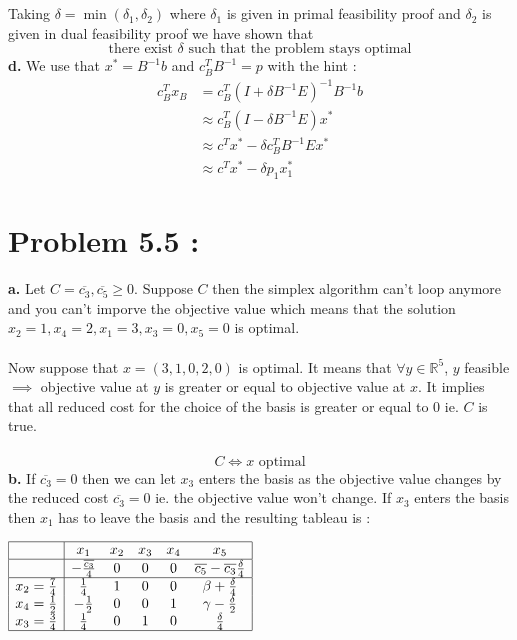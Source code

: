 \documentclass{article}
\begin{document}
\\\\
Taking $\delta = \min(\delta_1,\delta_2)$ where $\delta_1$ is given in primal feasibility proof and $\delta_2$ is given in dual feasibility proof we have shown that $$\boxed{\text{there exist $\delta$ such that the problem stays optimal}}$$
\textbf{d.} We use that $x^* = B^{-1}b$ and $c_B^TB^{-1} = p$ with the hint : $$\boxed{\begin{split}
    c_B^Tx_B &= c_B^T(I+\delta B^{-1} E)^{-1}B^{-1}b\\
    &\approx c_B^T(I-\delta B^{-1} E)x^*\\
    &\approx c^Tx^*-\delta c_B^TB^{-1} Ex^*\\
    &\approx c^Tx^*-\delta p_1x^*_1
\end{split}}$$
\section*{Problem 5.5 :}
\textbf{a.} Let $C = \overline{c_3},\overline{c_5}\ge 0$. Suppose $C$ then the simplex algorithm can't loop anymore and you can't imporve the objective value which means that the solution $x_2 = 1,x_4 = 2, x_1 = 3,x_3 = 0, x_5=0$ is optimal.
\\\\
Now suppose that $x = (3,1,0,2,0)$ is optimal. It means that $\forall y\in \mathbb{R}^5$, $y$ feasible $\implies$ objective value at $y$ is greater or equal to objective value at $x$. It implies that all reduced cost for the choice of the basis is greater or equal to 0 ie. $C$ is true.
\\\\
$$\boxed{C \Leftrightarrow x \text{ optimal}}$$
\textbf{b.} If $\overline{c_3} = 0$ then we can let $x_3$ enters the basis as the objective value changes by the reduced cost $\overline{c_3} = 0$ ie. the objective value won't change. If $x_3$ enters the basis then $x_1$ has to leave the basis and the resulting tableau is : \\
\begin{center}$
    \begin{array}{|c|ccccc|}
    \hline
     &x_1&x_2&x_3&x_4&x_5\\\hline
     &-\frac{\overline{c_3}}{4}& 0 & 0 & 0 & \overline{c_5}-\overline{c_3}\frac{\delta}{4}\\\hline
    x_2 = \frac{7}{4}& \frac{1}{4}& 1 & 0& 0 & \beta+\frac{\delta}{4}\\
    x_4 = \frac{1}{2}& -\frac{1}{2}& 0 & 0 & 1 & \gamma - \frac{\delta}{2}\\
    x_3 = \frac{3}{4}& \frac{1}{4} & 0 & 1 & 0 & \frac{\delta}{4}\\\hline
\end{array}$\end{center}
\end{document}
